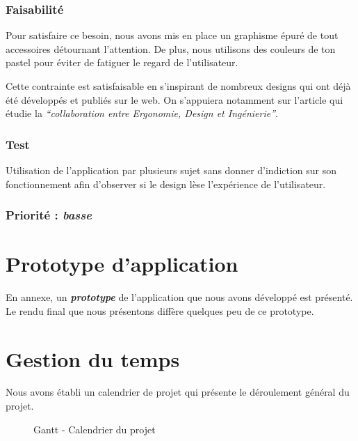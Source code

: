 \subsubsection{Faisabilité}

Pour satisfaire ce besoin, nous avons mis en place un graphisme épuré de tout accessoires détournant l’attention. De plus, nous utilisons des couleurs de ton pastel pour éviter de fatiguer le regard de l’utilisateur.

Cette contrainte est satisfaisable en s’inspirant de nombreux designs qui ont déjà été développés et publiés sur le web. On s’appuiera notamment sur l’article \cite{lente2014scenariser} qui étudie la \textit{“collaboration entre Ergonomie, Design et Ingénierie”}.

\subsubsection{Test}

Utilisation de l’application par plusieurs sujet sans donner d’indiction sur son fonctionnement afin d’observer si le design lèse l'expérience de l’utilisateur.

\subsubsection{Priorité : \textit{basse}}

\section{Prototype d'application}

 En annexe, un \textbf{\textit{prototype}} de l'application que nous avons développé est présenté. Le rendu final que nous présentons diffère quelques peu de ce prototype.

\section{Gestion du temps}

Nous avons établi un calendrier de projet qui présente le déroulement général du projet.

\begin{figure}[!ht]
 \begin{center}
   \caption{\label{gantt} Gantt - Calendrier du projet}
 \end{center}  
\end{figure}

